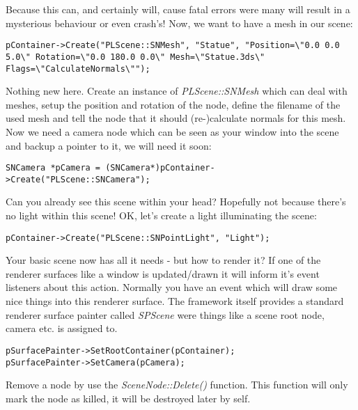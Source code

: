 Because this can, and certainly will, cause fatal errors were many will result in a mysterious behaviour or even crash's! Now, we want to have a mesh in our scene:

\begin{lstlisting}[caption=Creating a new scene node mesh instance]
pContainer->Create("PLScene::SNMesh", "Statue", "Position=\"0.0 0.0 5.0\" Rotation=\"0.0 180.0 0.0\" Mesh=\"Statue.3ds\" Flags=\"CalculateNormals\"");
\end{lstlisting}

Nothing new here. Create an instance of \emph{PLScene::SNMesh} which can deal with meshes, setup the position and rotation of the node, define the filename of the used mesh and tell the node that it should (re-)calculate normals for this mesh. Now we need a camera node which can be seen as your window into the scene and backup a pointer to it, we will need it soon:

\begin{lstlisting}[caption=Creating a new camera scene node instance]
SNCamera *pCamera = (SNCamera*)pContainer->Create("PLScene::SNCamera");
\end{lstlisting}

Can you already see this scene within your head? Hopefully not because there's no light within this scene! OK, let's create a light illuminating the scene:

\begin{lstlisting}[caption=Creating a new light scene node instance]
pContainer->Create("PLScene::SNPointLight", "Light");
\end{lstlisting}

Your basic scene now has all it needs - but how to render it? If one of the renderer surfaces like a window is updated/drawn it will inform it's event listeners about this action. Normally you have an event which will draw some nice things into this renderer surface. The framework itself provides a standard renderer surface painter called \emph{SPScene} were things like a scene root node, camera etc. is assigned to.

\begin{lstlisting}[caption=SPScene setup]
pSurfacePainter->SetRootContainer(pContainer);
pSurfacePainter->SetCamera(pCamera);
\end{lstlisting}

Remove a node by use the \emph{SceneNode::Delete()} function. This function will only mark the node as killed, it will be destroyed later by self.

